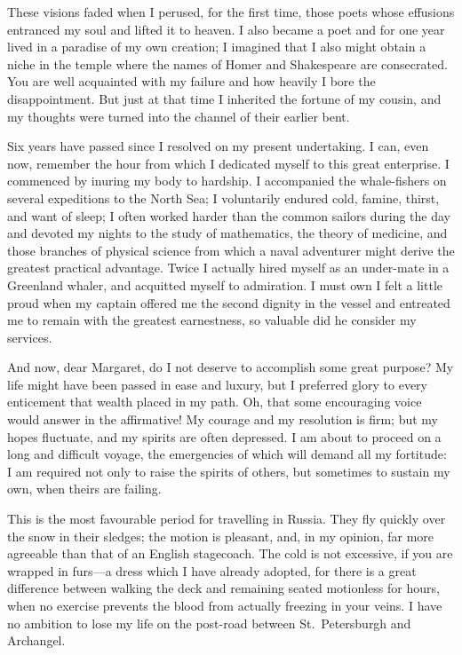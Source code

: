 \documentclass[12pt,openright]{book}
\begin{document}
These visions faded when I perused, for the first time, those poets whose effusions entranced my soul and lifted it to heaven. I also became a poet and for one year lived in a paradise of my own creation; I imagined that I also might obtain a niche in the temple where the names of Homer and Shakespeare are consecrated. You are well acquainted with my failure and how heavily I bore the disappointment. But just at that time I inherited the fortune of my cousin, and my thoughts were turned into the channel of their earlier bent.

Six years have passed since I resolved on my present undertaking. I can, even now, remember the hour from which I dedicated myself to this great enterprise. I commenced by inuring my body to hardship. I accompanied the whale-fishers on several expeditions to the North Sea; I voluntarily endured cold, famine, thirst, and want of sleep; I often worked harder than the common sailors during the day and devoted my nights to the study of mathematics, the theory of medicine, and those branches of physical science from which a naval adventurer might derive the greatest practical advantage. Twice I actually hired myself as an under-mate in a Greenland whaler, and acquitted myself to admiration. I must own I felt a little proud when my captain offered me the second dignity in the vessel and entreated me to remain with the greatest earnestness, so valuable did he consider my services.

And now, dear Margaret, do I not deserve to accomplish some great purpose? My life might have been passed in ease and luxury, but I preferred glory to every enticement that wealth placed in my path. Oh, that some encouraging voice would answer in the affirmative! My courage and my resolution is firm; but my hopes fluctuate, and my spirits are often depressed. I am about to proceed on a long and difficult voyage, the emergencies of which will demand all my fortitude: I am required not only to raise the spirits of others, but sometimes to sustain my own, when theirs are failing.

This is the most favourable period for travelling in Russia. They fly quickly over the snow in their sledges; the motion is pleasant, and, in my opinion, far more agreeable than that of an English stagecoach. The cold is not excessive, if you are wrapped in furs—a dress which I have already adopted, for there is a great difference between walking the deck and remaining seated motionless for hours, when no exercise prevents the blood from actually freezing in your veins. I have no ambition to lose my life on the post-road between St. Petersburgh and Archangel.
\end{document}
